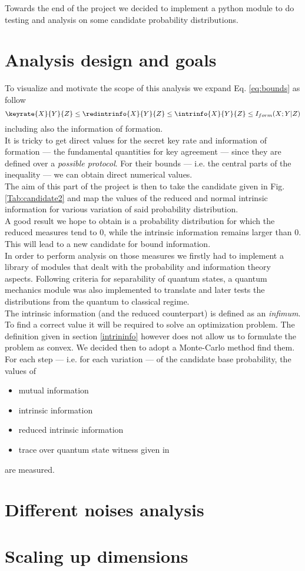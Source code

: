 Towards the end of the project we decided to implement a python module to do testing and analysis on some candidate probability distributions.
\section{Analysis design and goals}
    To visualize and motivate the scope of this analysis we expand Eq. \ref{eq:bounds} as follow
    \begin{equation}
    	\keyrate{X}{Y}{Z} \leq \redintrinfo{X}{Y}{Z} \leq \intrinfo{X}{Y}{Z} \leq I_{form} (X;Y|Z)
    \end{equation}
    including also the information of formation.\\
    It is tricky to get direct values for the secret key rate and information of formation --- the fundamental quantities for key agreement --- since they are defined over a \textit{possible protocol}. 
    For their bounds --- i.e. the central parts of the inequality --- we can obtain direct numerical values. \\
    The aim of this part of the project is then to take the candidate given in Fig. \ref{Tab:candidate2} and map the values of the reduced and normal intrinsic information for various variation of said probability distribution.\\
    
    A good result we hope to obtain is a probability distribution for which the reduced measures tend to $0$, while the intrinsic information remains larger than $0$. This will lead to a new candidate for bound information.\\
    
    In order to perform analysis on those measures we firstly had to implement a library of modules that dealt with the probability and information theory aspects.
    Following criteria for separability of quantum states, a quantum mechanics module was also implemented to translate and later tests the distributions from the quantum to classical regime.\\
    The intrinsic information (and the reduced counterpart) is defined as an \emph{infimum}. 
    To find a correct value it will be required to solve an optimization problem. 
    The definition given in section \ref{intrininfo} however does not allow us to formulate the problem as convex.
    We decided then to adopt a Monte-Carlo method find them.\\
     
    For each step --- i.e. for each variation --- of the candidate base probability, the values of 
    \begin{itemize}
    	\item	mutual information
    	\item	intrinsic information
    	\item	reduced intrinsic information
    	\item	trace over quantum state witness given in \cite{DPS04}
    \end{itemize}
    are measured.
\section{Different noises analysis}
\section{Scaling up dimensions}
